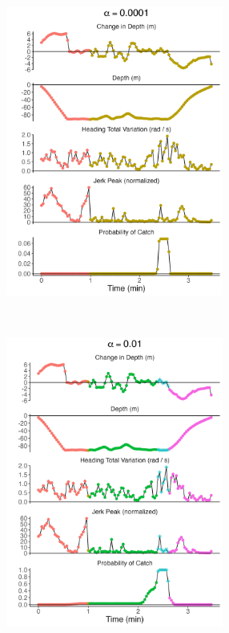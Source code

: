 \begin{figure}
    \centering
    \begin{subfigure}[t]{0.45\textwidth}
        \centering
        \includegraphics[height = 3.75in]{plt/profile_delt_d_htv_jp_normed_-4_4_pos_5975.png}
    \end{subfigure}
    ~
    \begin{subfigure}[t]{0.45\textwidth}
        \centering
        \includegraphics[height = 3.75in]{plt/profile_delt_d_htv_jp_normed_-2_4_pos_5975.png}
    \end{subfigure}
    \\

\end{figure}
